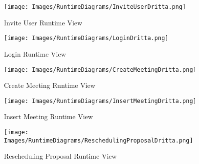 
\begin{figure}[h]
	\centering\texttt{[image: Images/RuntimeDiagrams/InviteUserDritta.png]}
	\caption{Invite User Runtime View}
\end{figure}

\begin{figure}[h]
	\centering\texttt{[image: Images/RuntimeDiagrams/LoginDritta.png]}
	\caption{Login Runtime View}
\end{figure}

\begin{figure}[h]
	\centering\texttt{[image: Images/RuntimeDiagrams/CreateMeetingDritta.png]}
	\caption{Create Meeting Runtime View}
\end{figure}

\begin{figure}[h]
	\centering\texttt{[image: Images/RuntimeDiagrams/InsertMeetingDritta.png]}
	\caption{Insert Meeting Runtime View}
\end{figure}

\begin{figure}[h]
	\centering\texttt{[image: Images/RuntimeDiagrams/ReschedulingProposalDritta.png]}
	\caption{Rescheduling Proposal Runtime View}
\end{figure}

\clearpage